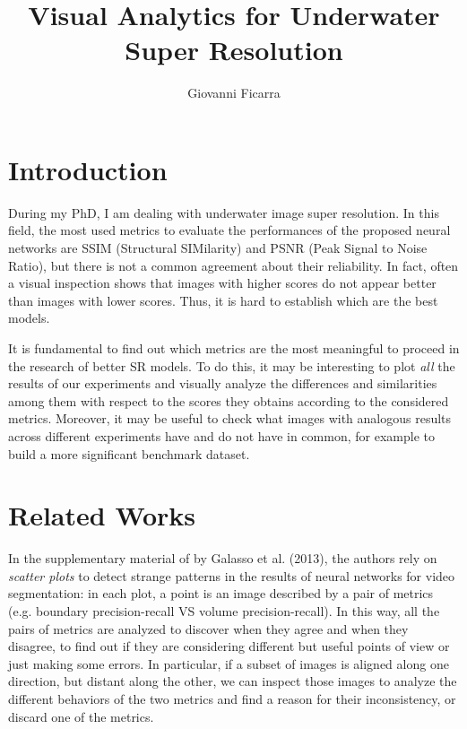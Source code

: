 \documentclass[12pt]{article}
\title{Visual Analytics for Underwater Super Resolution}
\author{Giovanni Ficarra}
\date{}
\begin{document}
	\maketitle

	\section{Introduction}

	During my PhD, I am dealing with underwater image super resolution. In this field, the most used metrics to evaluate the performances of the proposed neural networks are SSIM (Structural SIMilarity) and PSNR (Peak Signal to Noise Ratio), but there is not a common agreement about their reliability. In fact, often a visual inspection shows that images with higher scores do not appear better than images with lower scores. Thus, it is hard to establish which are the best models.

	It is fundamental to find out which metrics are the most meaningful to proceed in the research of better SR models. To do this, it may be interesting to plot \textit{all} the results of our experiments and visually analyze the differences and similarities among them with respect to the scores they obtains according to the considered metrics.
	Moreover, it may be useful to check what images with analogous results across different experiments have and do not have in common, for example to build a more significant benchmark dataset.


	\section{Related Works}

	In the supplementary material \cite{galassounified} of \cite{galasso2013unified} by Galasso et al. (2013), the authors rely on \textit{scatter plots} to detect strange patterns in the results of neural networks for video segmentation: in each plot, a point is an image described by a pair of metrics (e.g. boundary precision-recall VS volume precision-recall). In this way, all the pairs of metrics are analyzed to discover when they agree and when they disagree, to find out if they are considering different but useful points of view or just making some errors.
	In particular, if a subset of images is aligned along one direction, but distant along the other, we can inspect those images to analyze the different behaviors of the two metrics and find a reason for their inconsistency, or discard one of the metrics.
\end{document}

